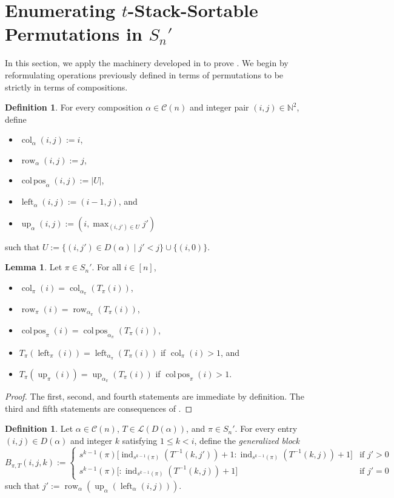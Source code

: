 \documentclass[12pt]{amsart}
\DeclareMathOperator{\col}{col}
\DeclareMathOperator{\colpos}{col\,pos}
\DeclareMathOperator{\ind}{ind}
\DeclareMathOperator{\leftof}{left}
\DeclareMathOperator{\row}{row}
\DeclareMathOperator{\upof}{up}
\theoremstyle{definition}
\newtheorem{lemma}[theorem]{Lemma}
\newtheorem{definition}[theorem]{Definition}
\begin{document}
\section{Enumerating $t$-Stack-Sortable Permutations in $S_n'$}
In this section, we apply the machinery developed in  to prove . We begin by reformulating operations previously defined in terms of permutations to be strictly in terms of compositions.  
\begin{definition}
For every composition $\alpha\in\mathcal{C}(n)$ and integer pair $(i,j)\in \mathbb{N}^2$, define
\begin{itemize}
\item $\col_{\alpha}(i,j):=i$,
\item $\row_{\alpha}(i,j):=j$,
\item $\colpos_{\alpha}(i,j):=|U|$,
\item $\leftof_{\alpha}(i,j):=(i-1,j)$, and
\item $\upof_{\alpha}(i,j):=(i,\max\nolimits_{(i,j')\in U}j')$
\end{itemize}
such that $U:=\{(i,j')\in D(\alpha)\mid j'<j\}\cup\{(i,0)\}$.
\end{definition}
\begin{lemma}
Let $\pi\in S_n'$. For all $i\in[n]$,
\begin{itemize}
\item $\col_{\pi}(i)=\col_{\alpha_{\pi}}(T_{\pi}(i))$,
\item $\row_{\pi}(i)=\row_{\alpha_{\pi}}(T_{\pi}(i))$,
\item $\colpos_{\pi}(i)=\colpos_{\alpha_{\pi}}(T_{\pi}(i))$,
\item $T_{\pi}(\leftof_{\pi}(i))=\leftof_{\alpha_{\pi}}(T_{\pi}(i))$ if $\col_{\pi}(i)>1$, and
\item $T_{\pi}(\upof_{\pi}(i))=\upof_{\alpha_{\pi}}(T_{\pi}(i))$ if $\colpos_{\pi}(i)>1$.
\end{itemize}
\end{lemma}
\begin{proof}
The first, second, and fourth statements are immediate by definition. The third and fifth statements are consequences of .
\end{proof}
\begin{definition}
Let $\alpha\in\mathcal{C}(n)$, $T\in\mathcal{L}(D(\alpha))$, and $\pi\in S_n'$. For every entry $(i,j)\in D(\alpha)$ and integer $k$ satisfying $1\le k<i$, define the \textit{generalized block}
\[B_{\pi,T}(i,j,k):=\begin{cases}s^{k-1}(\pi)\big[\ind_{s^{k-1}(\pi)}(T^{-1}(k,j'))+1 : \ind_{s^{k-1}(\pi)}(T^{-1}(k,j))+1\big] &\text{if }j'>0 \\ s^{k-1}(\pi)\big[: \ind_{s^{k-1}(\pi)}(T^{-1}(k,j))+1\big] &\text{if }j'=0\end{cases}\]
such that $j':=\row_{\alpha}(\upof_{\alpha}(\leftof_{\alpha}(i,j)))$.
\end{definition}
\end{document}
